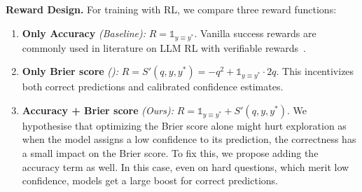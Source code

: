 \documentclass{article} %
\begin{document}
\textbf{Reward Design.} For training with RL, we compare three reward functions:
\begin{enumerate}
  \item \textbf{Only Accuracy} \textit{(Baseline):} \( R = \mathds{1}_{y \equiv y^*} \). Vanilla success rewards are commonly used in literature on LLM RL with verifiable rewards~\citep{guo2025deepseek}.
  \item \textbf{Only Brier score} \textit{(\citet{damani2025beyond}):} \( R = S'(q, y, y^*) = -q^2 + \mathds{1}_{y \equiv y^*}\cdot 2q \). This incentivizes both correct predictions and calibrated confidence estimates.
  \item \textbf{Accuracy + Brier score} \textit{(Ours):} \( R = \mathds{1}_{y \equiv y^*} + S'(q, y, y^*) \). We hypothesise that optimizing the Brier score alone might hurt exploration as when the model assigns a low confidence to its prediction, the correctness has a small impact on the Brier score. To fix this, we propose adding the accuracy term as well. In this case, even on hard questions, which merit low confidence, models get a large boost for correct predictions.
\end{enumerate}
\end{document}
